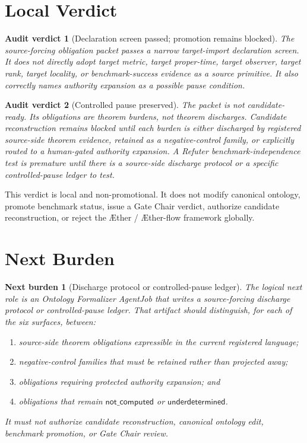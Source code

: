 \documentclass[11pt]{article}
\newcommand{\Aether}{\AE{}ther}
\newcommand{\Aflow}{\AE{}ther-flow}
\newcommand{\TheoryProgram}{\Aether{} / \Aflow{} framework}
\newtheorem{auditverdict}{Audit verdict}
\newtheorem{nextburden}{Next burden}
\begin{document}
\section{Local Verdict}

\begin{auditverdict}[Declaration screen passed; promotion remains blocked]
The source-forcing obligation packet passes a narrow target-import declaration
screen. It does not directly adopt target metric, target proper-time, target
observer, target rank, target locality, or benchmark-success evidence as a
source primitive. It also correctly names authority expansion as a possible
pause condition.
\end{auditverdict}

\begin{auditverdict}[Controlled pause preserved]
The packet is not candidate-ready. Its obligations are theorem burdens, not
theorem discharges. Candidate reconstruction remains blocked until each burden
is either discharged by registered source-side theorem evidence, retained as a
negative-control family, or explicitly routed to a human-gated authority
expansion. A Refuter benchmark-independence test is premature until there is a
source-side discharge protocol or a specific controlled-pause ledger to test.
\end{auditverdict}

This verdict is local and non-promotional. It does not modify canonical
ontology, promote benchmark status, issue a Gate Chair verdict, authorize
candidate reconstruction, or reject the \TheoryProgram{} globally.

\section{Next Burden}

\begin{nextburden}[Discharge protocol or controlled-pause ledger]
The logical next role is an Ontology Formalizer AgentJob that writes a
source-forcing discharge protocol or controlled-pause ledger. That artifact
should distinguish, for each of the six surfaces, between:
\begin{enumerate}
    \item source-side theorem obligations expressible in the current
    registered language;
    \item negative-control families that must be retained rather than
    projected away;
    \item obligations requiring protected authority expansion; and
    \item obligations that remain \(\mathsf{not\_computed}\) or
    \(\mathsf{underdetermined}\).
\end{enumerate}
It must not authorize candidate reconstruction, canonical ontology edit,
benchmark promotion, or Gate Chair review.
\end{nextburden}
\end{document}
